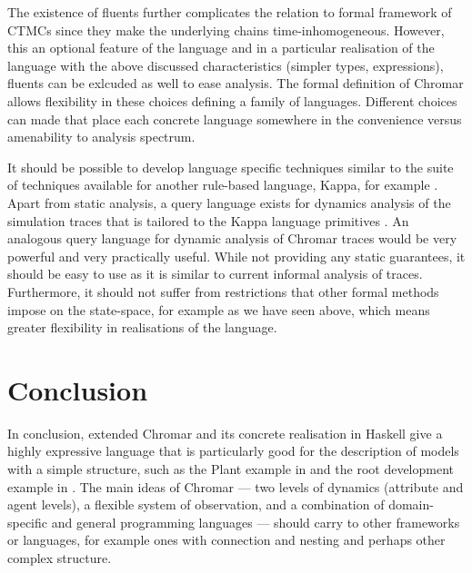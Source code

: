 The existence of fluents further complicates the relation to formal framework of
CTMCs since they make the underlying chains time-inhomogeneous. However, this an
optional feature of the language and in a particular realisation of the language
with the above discussed characteristics (\ie simpler types, expressions),
fluents can be exlcuded as well to ease analysis. The formal definition of
Chromar allows flexibility in these choices defining a family of
languages. Different choices can made that place each concrete language
somewhere in the convenience versus amenability to analysis spectrum.

It should be possible to develop language specific techniques similar
to the suite of techniques available for another rule-based language, Kappa, for
example \citep{Boutillier2018, Camporesi2017}. Apart from static analysis, a
query language exists for dynamics analysis of the simulation traces that is
tailored to the Kappa language primitives \citep{laurent_trace_2018}. An
analogous query language for dynamic analysis of Chromar traces would be very
powerful and very practically useful. While not providing any static guarantees,
it should be easy to use as it is similar to current informal analysis of
traces. Furthermore, it should not suffer from restrictions that other formal
methods impose on the state-space, for example as we have seen above, which
means greater flexibility in realisations of the language.

\section{Conclusion}
In conclusion, extended Chromar and its concrete realisation in Haskell give a
highly expressive language that is particularly good for the description of
models with a simple structure, such as the Plant example in
 and the root development example in
. The main ideas of Chromar --- two levels of dynamics
(attribute and agent levels), a flexible system of observation, and a
combination of domain-specific and general programming languages --- should
carry to other frameworks or languages, for example ones with connection and
nesting and perhaps other complex structure.

